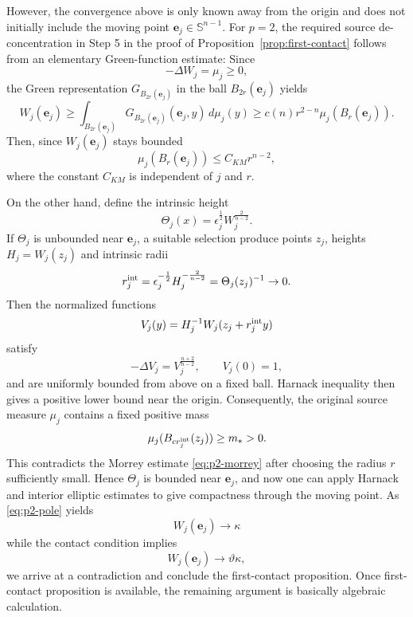 \documentclass[reqno,12pt]{amsart}
\numberwithin{equation}{section}
\theoremstyle{remark}
\begin{document}
However, the convergence above is only known away from the origin and does not initially include the moving point $\mathbf{e}_j\in\mathbb S^{n-1}$. 
For $p=2$, the required source de-concentration in Step 5 in the proof of Proposition~\ref{prop:first-contact} follows from an elementary Green-function estimate: Since
$$
-\Delta W_j = \mu_j\ge 0,
$$
the Green representation $G_{B_{2r}(\mathbf{e}_j)}$ in the ball $B_{2r}(\mathbf{e}_j)$ yields
$$
W_j(\mathbf{e}_j)\ge \int_{B_{2r}(\mathbf{e}_j)}G_{B_{2r}(\mathbf{e}_j)}(\mathbf{e}_j,y) \,d\mu_j(y)\ge c(n) r^{2-n}\mu_j(B_r(\mathbf{e}_j)). 
$$
Then, since $W_j(\mathbf{e}_j)$ stays bounded
\begin{equation}\label{eq:p2-morrey}
\mu_j(B_r(\mathbf{e}_j))\le C_{KM} r^{n-2}, 
\end{equation}
where the constant $C_{KM}$ is independent of $j$ and $r$.
 

On the other hand, define the intrinsic height
$$\Theta_j(x)=\epsilon_j^{\frac 1 2} W_j^{\frac 2{n-2}}.$$
If $\Theta_j$ is unbounded near $\mathbf{e}_j$, a suitable selection produce points $z_j$, heights $H_j=W_j(z_j)$ and intrinsic radii
$$r_j^{\rm int}=\epsilon_j^{-\frac 1 2}H_j^{-\frac 2{n-2}} =\Theta_j(z_j)^{-1}\to 0.$$
Then the normalized functions 
$$
V_j(y)=H_j^{-1}W_j(z_j+r_j^{\rm int} y )
$$ 
satisfy 
$$-\Delta V_j = V_j^{\frac{n+2}{n-2}},\qquad V_j(0)=1, $$
and are uniformly bounded from above on a fixed ball. Harnack inequality then gives a positive lower bound near the origin. Consequently, the original source measure $\mu_j$ contains a fixed positive mass
$$
\mu_j(B_{cr_j^{\rm int}}(z_j))\ge m_*>0.
$$
This contradicts the Morrey estimate \eqref{eq:p2-morrey} after choosing the radius $r$ sufficiently small. Hence $\Theta_j$ is bounded near $\mathbf {e}_j$, and now one can apply Harnack and interior elliptic estimates to give compactness through the moving point. As \eqref{eq:p2-pole} yields
$$W_j(\mathbf{e}_j)\to \kappa$$
while the contact condition implies
$$W_j(\mathbf{e}_j)\to \vartheta\kappa,$$
we arrive at a contradiction and conclude the first-contact proposition. Once first-contact proposition is available, the remaining argument is basically algebraic calculation. 
\end{document}
